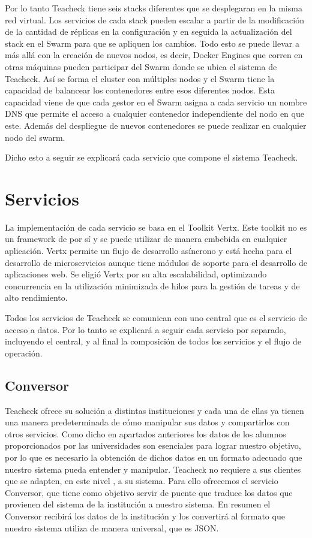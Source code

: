 Por lo tanto Teacheck tiene seis stacks diferentes que se desplegaran
en la misma red virtual. Los servicios de cada stack pueden escalar a
partir de la modificación de la cantidad de réplicas en la
configuración y en seguida la actualización del stack en el Swarm para
que se apliquen los cambios. Todo esto se puede llevar a más allá con
la creación de nuevos nodos, es decir, Docker Engines que corren en
otras máquinas pueden participar del Swarm donde se ubica el sistema
de Teacheck. Así se forma el cluster con múltiples nodos y el Swarm
tiene la capacidad de balancear los contenedores entre esos diferentes
nodos. Esta capacidad viene de que cada gestor en el Swarm asigna a
cada servicio un nombre DNS que permite el acceso a cualquier
contenedor independiente del nodo en que este. Además del despliegue
de nuevos contenedores se puede realizar en cualquier nodo del swarm.

Dicho esto a seguir se explicará cada servicio que compone el sistema
Teacheck.

\section{Servicios}

La implementación de cada servicio se basa en el Toolkit Vertx. Este
toolkit no es un framework de por sí y se puede utilizar de manera
embebida en cualquier aplicación. Vertx permite un flujo de desarrollo
asíncrono y está hecha para el desarrollo de microservicios aunque
tiene módulos de soporte para el desarrollo de aplicaciones web. Se
eligió Vertx por su alta escalabilidad, optimizando concurrencia en la
utilización minimizada de hilos para la gestión de tareas y de alto
rendimiento.


Todos los servicios de Teacheck se comunican con uno central que es el
servicio de acceso a datos. Por lo tanto se explicará a seguir cada
servicio por separado, incluyendo el central, y al final la
composición de todos los servicios y el flujo de operación.

\subsection{Conversor}

Teacheck ofrece su solución a distintas instituciones y cada una de
ellas ya tienen una manera predeterminada de cómo manipular sus datos
y compartirlos con otros servicios. Como dicho en apartados anteriores
los datos de los alumnos proporcionados por las universidades son
esenciales para lograr nuestro objetivo, por lo que es necesario la
obtención de dichos datos en un formato adecuado que nuestro sistema
pueda entender y manipular. Teacheck no requiere a sus clientes que se
adapten, en este nivel , a su sistema. Para ello ofrecemos el servicio
Conversor, que tiene como objetivo servir de puente que traduce los
datos que provienen del sistema de la institución a nuestro
sistema. En resumen el Conversor recibirá los datos de la institución
y los convertirá al formato que nuestro sistema utiliza de manera
universal, que es JSON.

